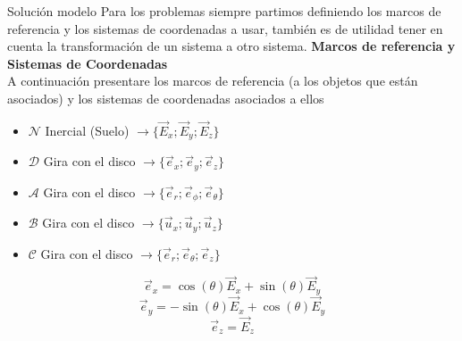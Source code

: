 \begin{solucion}{Solución modelo}
Para los problemas siempre partimos definiendo los marcos de referencia y los sistemas de coordenadas a usar, también es de utilidad tener en cuenta la transformación de un sistema a otro sistema.
\textbf{Marcos de referencia y Sistemas de Coordenadas}\\
A continuación presentare los marcos de referencia (a los objetos que están asociados) y los sistemas de coordenadas asociados a ellos
    \begin{itemize}
    \item $\mathcal{N}$ Inercial (Suelo) $\longrightarrow\{\vec{E}_x;\vec{E}_y;\vec{E}_z\}$
    \item $\mathcal{D}$ Gira con el disco $\longrightarrow\{\vec{e}_x;\vec{e}_y;\vec{e}_z\}$
    \item $\mathcal{A}$ Gira con el disco $\longrightarrow\{\vec{e}_r;\vec{e}_\phi;\vec{e}_\theta\}$
    \item $\mathcal{B}$ Gira con el disco $\longrightarrow\{\vec{u}_x;\vec{u}_y;\vec{u}_z\}$
    \item $\mathcal{C}$ Gira con el disco $\longrightarrow\{\vec{e}_r;\vec{e}_\theta;\vec{e}_z\}$
\end{itemize}
\begin{center}
    \begin{minipage}{0.48\textwidth}
        \centering
    \end{minipage}
    \hfill %
    \begin{minipage}{0.48\textwidth}
        \centering
    \end{minipage}
\end{center}
$$\vec{e}_x=\cos{(\theta)}\vec{E}_x+\sin{(\theta)}\vec{E}_y$$
$$\vec{e}_y=-\sin{(\theta)}\vec{E}_x+\cos{(\theta)}\vec{E}_y$$
$$\vec{e}_z=\vec{E}_z$$



\end{solucion}

